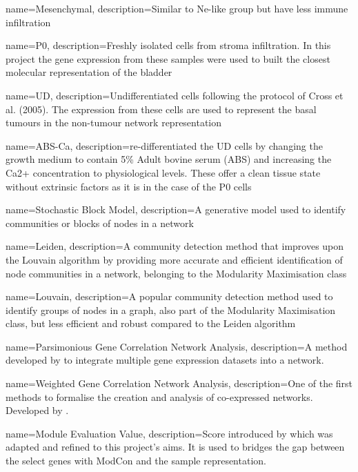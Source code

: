 {
    name=Mesenchymal,
    description={Similar to Ne-like group but have less immune infiltration}
}

{
    name=P0,
    description={Freshly isolated cells from stroma infiltration. In this project the gene expression from these samples were used to built the closest molecular representation of the bladder}
}

{
    name=UD,
    description={Undifferentiated cells following the protocol of Cross et al. (2005). The expression from these cells are used to represent the basal tumours in the non-tumour network representation}
}

{
    name=ABS-Ca,
    description={re-differentiated the UD cells by changing the growth medium to contain 5\% Adult bovine serum (ABS) and increasing the Ca2+ concentration to physiological levels. These offer a clean tissue state without extrinsic factors as it is in the case of the P0 cells}
}


{
    name=Stochastic Block Model,
    description={A generative model used to identify communities or blocks of nodes in a network}
}

{
    name=Leiden,
    description={A community detection method that improves upon the Louvain algorithm by providing more accurate and efficient identification of node communities in a network, belonging to the Modularity Maximisation class}
}

{
    name=Louvain,
    description={A popular community detection method used to identify groups of nodes in a graph, also part of the Modularity Maximisation class, but less efficient and robust compared to the Leiden algorithm}
}


{
    name=Parsimonious Gene Correlation Network Analysis,
    description={A method developed by \citet{Care2019-ij} to integrate multiple gene expression datasets into a network.}
}

{
    name=Weighted Gene Correlation Network Analysis,
    description={One of the first methods to formalise the creation and analysis of co-expressed networks. Developed by \citet{Langfelder2008-sn}.}
}


{
    name=Module Evaluation Value,
    description={Score introduced by \citep{Care2019-ij} which was adapted and refined to this project's aims. It is used to bridges the gap between the select genes with ModCon and the sample representation.}
}

